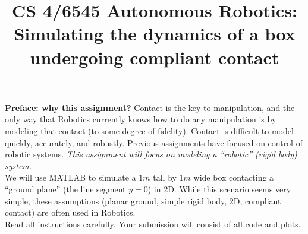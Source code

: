 \documentclass{article}
\title{CS 4/6545 Autonomous Robotics: \\Simulating the dynamics of a box undergoing compliant contact}
\date{}
\begin{document}
\maketitle

\textbf{Preface: why this assignment?}
Contact is the key to manipulation, and the only way that Robotics currently
knows how to do any manipulation is by modeling that contact (to some degree
of fidelity). Contact is difficult to model quickly, accurately, and robustly.
Previous assignments have focused on control of robotic systems. \emph{This 
assignment will focus on modeling a ``robotic'' (rigid body) system.}\\

We will use \textsc{MATLAB} to simulate a $1m$ tall by $1m$ wide box 
contacting a ``ground plane''
(the line segment $y=0$) in 2D. While this scenario seems very simple, these
assumptions (planar ground, simple rigid body, 2D, compliant contact) are often 
used in Robotics.\\

Read all instructions carefully. Your submission will consist of all
code and plots. 
\end{document}
